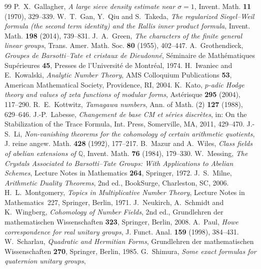 \documentclass[11pt]{amsart}
\newcommand{\Q}{\mathbb{Q}}
\theoremstyle{plain}
\theoremstyle{definition}
\numberwithin{equation}{section}
\begin{document}
\begin{thebibliography}{99}
 P.~X.~Gallagher, \emph{A large sieve density estimate near $\sigma=1$},
Invent. Math. \textbf{11} (1970), 329--339.
 W.~T.~Gan, Y.~Qiu and S.~Takeda, \emph{The regularized Siegel--Weil
  formula (the second term identity) and the Rallis inner product formula}, Invent. Math.
  \textbf{198} (2014), 739--831.
 J.~A.~Green, \emph{The characters of the finite general linear groups},
  Trans. Amer. Math. Soc. \textbf{80} (1955), 402--447.
 A.~Grothendieck, \emph{Groupes de Barsotti--Tate et cristaux de
  Dieudonn\'e}, S\'eminaire de Math\'ematiques Sup\'erieures \textbf{45}, Presses de l'Universit\'e
  de Montr\'eal, 1974.
 H.~Iwaniec and E.~Kowalski, \emph{Analytic Number Theory}, AMS
  Colloquium Publications \textbf{53}, American Mathematical Society, Providence, RI, 2004.
 K.~Kato, \emph{$p$-adic Hodge theory and values of zeta functions of modular
  forms}, Ast\'erisque \textbf{295} (2004), 117--290.
 R.~E.~Kottwitz, \emph{Tamagawa numbers}, Ann. of Math. (2)
  \textbf{127} (1988), 629--646.
 J.-P.~Labesse, \emph{Changement de base CM et s\'eries discr\`etes}, in: On the
  Stabilization of the Trace Formula, Int. Press, Somerville, MA, 2011, 429--470.
 J.-S.~Li, \emph{Non-vanishing theorems for the cohomology of certain arithmetic
  quotients}, J. reine angew. Math. \textbf{428} (1992), 177--217.
 B.~Mazur and A.~Wiles, \emph{Class fields of abelian extensions of $\Q$},
  Invent. Math. \textbf{76} (1984), 179--330.
 W.~Messing, \emph{The Crystals Associated to Barsotti--Tate Groups: With
  Applications to Abelian Schemes}, Lecture Notes in Mathematics \textbf{264}, Springer, 1972.
 J.~S.~Milne, \emph{Arithmetic Duality Theorems}, 2nd ed., BookSurge, Charleston,
  SC, 2006.
 H.~L.~Montgomery, \emph{Topics in Multiplicative Number Theory},
Lecture Notes in Mathematics~227, Springer, Berlin, 1971.
 J.~Neukirch, A.~Schmidt and K.~Wingberg, \emph{Cohomology of Number Fields}, 2nd ed.,
  Grundlehren der mathematischen Wissenschaften \textbf{323}, Springer, Berlin, 2008.
 A.~Paul, \emph{Howe correspondence for real unitary groups}, J. Funct.
  Anal. \textbf{159} (1998), 384--431.
 W.~Scharlau, \emph{Quadratic and Hermitian Forms}, Grundlehren der
  mathematischen Wissenschaften \textbf{270}, Springer, Berlin, 1985.
 G.~Shimura, \emph{Some exact formulas for quaternion unitary groups},

\end{thebibliography}
\end{document}
